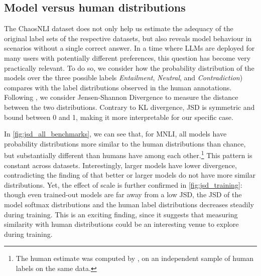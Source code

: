 \subsection{Model versus human distributions}\label{subsec:chaosnli_dist}
The ChaosNLI dataset does not only help us estimate the adequacy of the original label sets of the respective datasets, but also reveals model behaviour in scenarios without a single correct answer.
In a time where LLMs are deployed for many users with potentially different preferences, this question has become very practically relevant.
To do so, we consider how the probability distribution of the models over the three possible labels \textit{Entailment}, \textit{Neutral}, and \textit{Contradiction}) compares with the label distributions observed in the human annotations.
Following \citet{nie-etal-2020-learn}, we consider Jensen-Shannon Divergence \citep[JSD][]{menendez1997jensen} to measure the distance between the two distributions. 
%
%
Contrary to KL divergence, JSD is symmetric and bound between 0 and 1, making it more interpretable for our specific case.

In \cref{fig:jsd_all_benchmarks}, we can see that, for MNLI, all models have probability distributions more similar to the human distributions than chance, but substantially different than humans have among each other.\footnote{The human estimate was computed by \citet{nie-etal-2020-learn}, on an independent sample of human labels on the same data.}
This pattern is constant across datasets.
Interestingly, larger models have lower divergence, contradicting the finding of \citet{nie-etal-2020-learn} that better or larger models do not have more similar distributions.
Yet, the effect of scale is further confirmed in \cref{fig:jsd_training}: though even trained-out models are far away from a low JSD, the JSD of the model softmax distributions and the human label distributions decreases steadily during training.
This is an exciting finding, since it suggests that measuring similarity with human distributions could be an interesting venue to explore during training.

